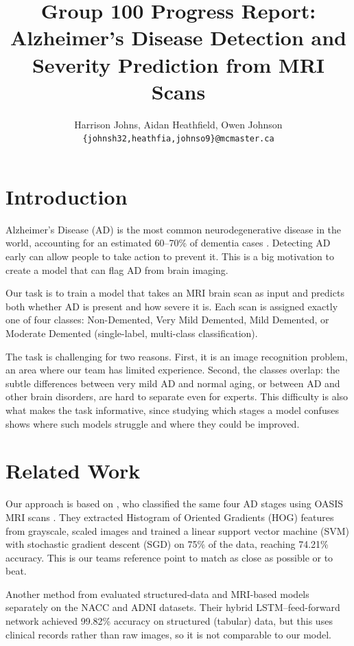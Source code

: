 \documentclass[11pt]{article}
\title{Group 100 Progress Report:\\Alzheimer's Disease Detection and Severity Prediction from MRI Scans}
\author{Harrison Johns, Aidan Heathfield, Owen Johnson \\
  \texttt{\{johnsh32,heathfia,johnso9\}@mcmaster.ca} }
\begin{document}
\maketitle

\section{Introduction}

Alzheimer's Disease (AD) is the most common neurodegenerative disease in the world, accounting for an estimated 60--70\% of dementia cases \citep{who_dementia}. Detecting AD early can allow people to take action to prevent it. This is a big motivation to create a model that can flag AD from brain imaging.

Our task is to train a model that takes an MRI brain scan as input and predicts both whether AD is present and how severe it is. Each scan is assigned exactly one of four classes: Non-Demented, Very Mild Demented, Mild Demented, or Moderate Demented (single-label, multi-class classification).

The task is challenging for two reasons. First, it is an image recognition problem, an area where our team has limited experience. Second, the classes overlap: the subtle differences between very mild AD and normal aging, or between AD and other brain disorders, are hard to separate even for experts. This difficulty is also what makes the task informative, since studying which stages a model confuses shows where such models struggle and where they could be improved.

\section{Related Work}

Our approach is based on \citet{vengala2024}, who classified the same four AD stages using OASIS MRI scans \citep{marcus2007}. They extracted Histogram of Oriented Gradients (HOG) features from grayscale, scaled images and trained a linear support vector machine (SVM) with stochastic gradient descent (SGD) on 75\% of the data, reaching 74.21\% accuracy. This is our teams reference point to match as close as possible or to beat.

Another method from \citet{mmadumbu2025} evaluated structured-data and MRI-based models separately on the NACC and ADNI datasets. Their hybrid LSTM--feed-forward network achieved 99.82\% accuracy on structured (tabular) data, but this uses clinical records rather than raw images, so it is not comparable to our model.
\end{document}
